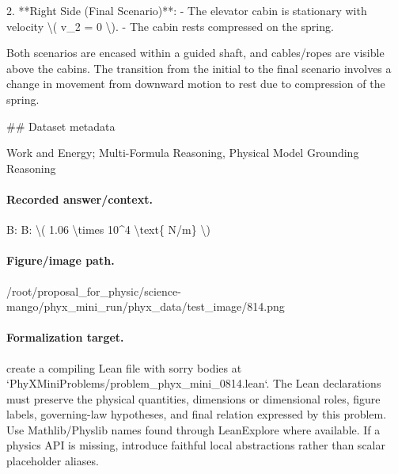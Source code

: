 2. **Right Side (Final Scenario)**:
   - The elevator cabin is stationary with velocity \textbackslash{}( v\_2 = 0 \textbackslash{}).
   - The cabin rests compressed on the spring.

Both scenarios are encased within a guided shaft, and cables/ropes are visible above the cabins. The transition from the initial to the final scenario involves a change in movement from downward motion to rest due to compression of the spring.

\#\# Dataset metadata

Work and Energy; Multi-Formula Reasoning, Physical Model Grounding Reasoning

\paragraph{Recorded answer/context.}
B: B: \textbackslash{}( 1.06 \textbackslash{}times 10\textasciicircum{}4 \textbackslash{}text\{ N/m\} \textbackslash{})

\paragraph{Figure/image path.}
/root/proposal\_for\_physic/science-mango/phyx\_mini\_run/phyx\_data/test\_image/814.png

\paragraph{Formalization target.}
create a compiling Lean file with sorry bodies at `PhyXMiniProblems/problem\_phyx\_mini\_0814.lean`. The Lean declarations must preserve the physical quantities, dimensions or dimensional roles, figure labels, governing-law hypotheses, and final relation expressed by this problem.
Use Mathlib/Physlib names found through LeanExplore where available. If a physics API is missing, introduce faithful local abstractions rather than scalar placeholder aliases.

